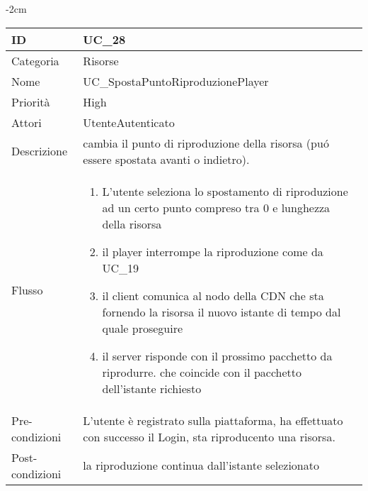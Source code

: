 \begin{center}
\begin{table}[bp]
    \centering
    \addtolength{\leftskip} {-2cm}
\begin{tabular}{ |p{2.6cm}|p{13cm}|  }
\hline
ID & UC\_28 \\\hline
Categoria & Risorse\\\hline
Nome & UC\_SpostaPuntoRiproduzionePlayer\\\hline
Priorità & High \\\hline
Attori &  UtenteAutenticato \\\hline
Descrizione & cambia il punto di riproduzione della risorsa (pu\'o essere spostata avanti o indietro).\\\hline
Flusso &  	\vspace{-5mm} \begin{enumerate}
			\item L'utente seleziona lo spostamento di riproduzione ad un certo punto compreso tra 0 e lunghezza della risorsa
			\item il player interrompe la riproduzione come da UC\_19
			\item il client comunica al nodo della CDN che sta fornendo la risorsa il nuovo istante di tempo dal quale proseguire
			\item il server risponde con il prossimo pacchetto da riprodurre. che coincide con il pacchetto dell'istante richiesto
		\end{enumerate}
			\\\hline
Pre-condizioni & L'utente è registrato sulla piattaforma, ha effettuato con successo il Login, sta riproducento una risorsa.\\\hline
Post-condizioni & la riproduzione continua dall'istante selezionato\\\hline
\end{tabular}
\label{table_use_case:28}\newline
\end{table}



\end{center}
